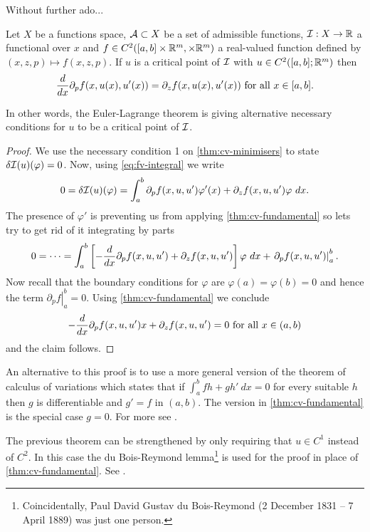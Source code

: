 Without further ado...

\begin{thm}

  Let $X$ be a functions space, $\mathcal{A} \subset X$ be a set of admissible
  functions, $\mathcal{I}: X \to \mathbb{R}$ a functional over $x$ and $f \in C^2([a, b]
  \times \mathbb{R}^m, \times \mathbb{R}^m)$ a real-valued function defined by $(x, z, p)
  \mapsto f(x, z, p)$. If $u$ is a critical point of $\mathcal{I}$ with $u \in
  C^2([a, b]; \mathbb{R}^m)$ then
  \begin{align}
    \label{eq:euler-lagrange}
    \frac{d}{dx} \partial_p f(x, u(x), u'(x)) = \partial_z f(x, u(x), u'(x)) \text{ for all } x \in [a, b].
  \end{align}
\end{thm}

In other words, the Euler-Lagrange theorem is giving alternative necessary
conditions for $u$ to be a critical point of $\mathcal{I}$.

\begin{proof}
  We use the necessary condition 1 on \autoref{thm:cv-minimisers} to state $\delta \mathcal{I}(u)(\varphi) = 0$. Now, using \eqref{eq:fv-integral} we write
  \[
    0 = \delta \mathcal{I}(u) (\varphi)
    = \int_a^b \partial_p f(x, u, u') \varphi'(x) + \partial_z f(x, u, u') \varphi\ dx.
  \]
  The presence of $\varphi'$ is preventing us from applying
  \autoref{thm:cv-fundamental} so lets try to get rid of it integrating by
  parts
  \[
    0 = \dots
      = \int_a^b \left[ - \frac{d}{dx} \partial_p f(x, u, u') + \partial_z f(x, u, u') \right] \varphi \ dx
        + \left. \partial_p f(x, u, u') \right|_a^b.
  \]
  Now recall that the boundary conditions for $\varphi$ are $\varphi(a) =
  \varphi(b) = 0$ and hence the term $\left. \partial_p f\right|_a^b = 0$.
    Using \autoref{thm:cv-fundamental} we conclude
    \[
      -\frac{d}{dx} \partial_p f(x, u, u')x + \partial_z f(x, u, u') = 0
      \text{ for all } x \in (a, b)
    \]
    and the claim follows.
\end{proof}

An alternative to this proof is to use a more general version of the theorem of
calculus of variations which states that if $\int_a^b fh + gh'\ dx = 0$ for
every suitable $h$ then $g$ is differentiable and $g' = f$ in $(a, b)$. The
version in \autoref{thm:cv-fundamental} is the special case $g = 0$. For more
see \cite{wikicvfundamental}. 

\begin{remark}
  The previous theorem can be strengthened by only requiring that $u \in C^1$
  instead of $C^2$. In this case the du Bois-Reymond
  lemma\footnote{Coincidentally, Paul David Gustav du Bois-Reymond (2 December
  1831 – 7 April 1889) was just one person.} is used for the proof in place of
  \autoref{thm:cv-fundamental}. See \cite{dubois}.
\end{remark}








